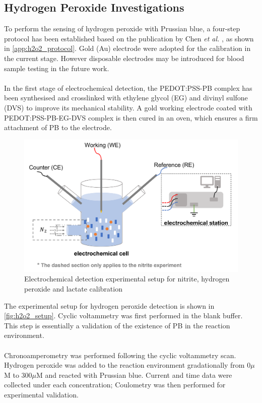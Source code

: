 \subsection{Hydrogen Peroxide Investigations}
To perform the sensing of hydrogen peroxide with Prussian blue, a four-step protocol has been established based on the publication by Chen \textit{et al.} \cite{C9AN02438G}, as shown in \autoref{app:h2o2_protocol}. Gold (Au) electrode were adopted for the calibration in the current stage. However disposable electrodes may be introduced for blood sample testing in the future work. \\\\
In the first stage of electrochemical detection, the PEDOT:PSS-PB complex has been synthesised and crosslinked with ethylene glycol (EG) and  divinyl sulfone (DVS) to improve its mechanical stability. A gold working electrode coated with PEDOT:PSS-PB-EG-DVS complex is then cured in an oven, which ensures a firm attachment of PB to the electrode.
\begin{figure}[H]
    \centering
    \includegraphics[width=.5\textwidth]{img/h2o2_setup.png}
    \caption{Electrochemical detection experimental setup for nitrite, hydrogen peroxide and lactate calibration}
    \label{fig:h2o2_setup}
\end{figure}
\noindent The experimental setup for hydrogen peroxide detection is shown in \autoref{fig:h2o2_setup}. Cyclic voltammetry was first performed in the blank buffer. This step is essentially a validation of the existence of PB in the reaction environment. \\\\
\noindent Chronoamperometry was performed following the cyclic voltammetry scan. Hydrogen peroxide was added to the reaction environment gradationally from 0$\mu$M to 300$\mu$M and reacted with Prussian blue. Current and time data were collected under each concentration; Coulometry was then performed for experimental validation.

